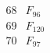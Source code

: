 \documentclass{article}
\begin{document}
{$$\begin{array}{|r|*{7}{r|}}
\\
\hline
68 
 & F_{96} &
 & 
 & 
 & 
 & 
 & 
\\
\hline
69 
 & F_{120} &
 & 
 & 
 & 
 & 
 & 
\\
\hline
70 
 & F_{97} &
 & 
 & 
 & 

\end{array}$$}
\end{document}
